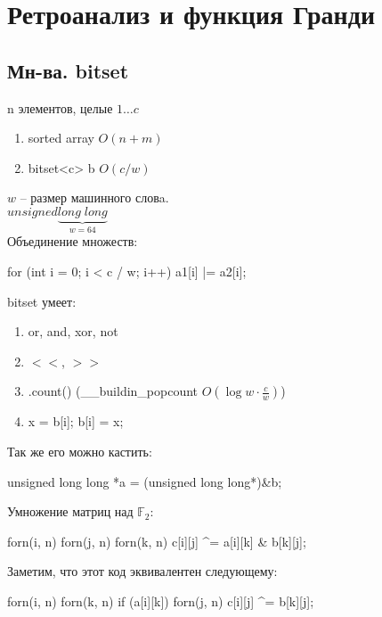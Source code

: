 \chapter{Ретроанализ и функция Гранди}

\section {Мн-ва. bitset}
n элементов, целые $1 \dots c$
\begin{enumerate}
\item sorted array $O(n + m)$\\
\item bitset<c> b $O(c/w)$\\
\end{enumerate}
$w$ -- размер машинного словa.\\
$unsigned \underbrace{long \; long}_{w = 64}$\\

Объединение множеств:
\begin{cppcode}
for (int i = 0; i < c / w; i++) {
    a1[i] |= a2[i];
}
\end{cppcode}

bitset умеет:
\begin{enumerate}
\item or, and, xor, not
\item $<<$, $>>$
\item .count() (\_\_buildin\_popcount $O(\log w \cdot \frac{c}{w})$)
\item
\begin{cppcode}
x = b[i];
b[i] = x;
\end{cppcode}
\end{enumerate}

Так же его можно кастить:\\
\begin{cppcode}
unsigned long long *a = (unsigned long long*)&b;
\end{cppcode}

Умножение матриц над $\mathbb{F}_2$:
\begin{cppcode}
forn(i, n) {
    forn(j, n) {
        forn(k, n) {
            c[i][j] ^= a[i][k] & b[k][j];
        }
    }
}
\end{cppcode}

Заметим, что этот код эквивалентен следующему:
\begin{cppcode}
forn(i, n) {
    forn(k, n) {
        if (a[i][k]) {
            forn(j, n) {
                c[i][j] ^= b[k][j];
            }
        }
    }
}
\end{cppcode}


